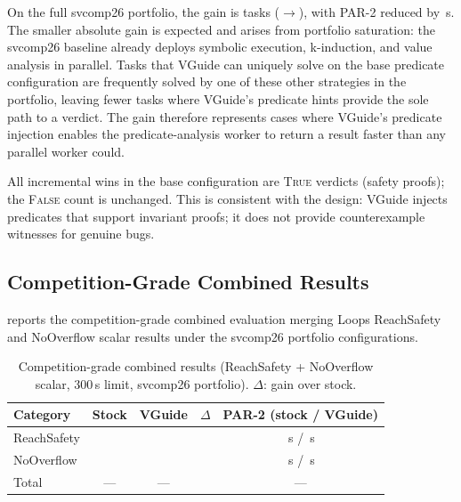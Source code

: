 On the full svcomp26 portfolio, the gain is \PortfolioLoopsDelta{} tasks
(\PortfolioLoopsStock{}$\to$\PortfolioLoopsVGuide{}), with PAR-2 reduced by
\PortfolioPARDelta{}\,s. The smaller absolute gain is expected and arises from
portfolio saturation: the svcomp26 baseline already deploys symbolic execution,
k-induction, and value analysis in parallel. Tasks that VGuide can uniquely solve on
the base predicate configuration are frequently solved by one of these other strategies
in the portfolio, leaving fewer tasks where VGuide's predicate hints provide the sole
path to a verdict. The \PortfolioLoopsDelta{} gain therefore represents cases where
VGuide's predicate injection enables the predicate-analysis worker to return a result
faster than any parallel worker could.

All \LoopsDelta{} incremental wins in the base configuration are \textsc{True} verdicts
(safety proofs); the \textsc{False} count is unchanged. This is consistent with the
design: VGuide injects predicates that support invariant proofs; it does not provide
counterexample witnesses for genuine bugs.

\subsection{Competition-Grade Combined Results}

 reports the competition-grade combined evaluation merging
Loops ReachSafety and NoOverflow scalar results under the svcomp26 portfolio
configurations.

\begin{table}[t]
  \caption{Competition-grade combined results (ReachSafety + NoOverflow scalar,
           300\,s limit, svcomp26 portfolio). \emph{$\Delta$}: gain over stock.}
  \label{tab:combined}
  \centering
  \begin{tabular}{lcccc}
    \toprule
    Category & Stock & VGuide & $\Delta$ & PAR-2 (stock / VGuide) \\
    \midrule
    ReachSafety  & \CompReachStock{} & \CompReachVGuide{} & \CompReachDelta{} & \CompPARReachStock{}\,s / \CompPARReachVGuide{}\,s \\
    NoOverflow   & \CompOvfStock{}   & \CompOvfVGuide{}   & \CompOvfDelta{}   & \CompPAROvfStock{}\,s  / \CompPAROvfVGuide{}\,s  \\
    \midrule
    Total        & ---               & ---                & \CompTotalDelta{} & --- \\
    \bottomrule
  \end{tabular}
\end{table}

